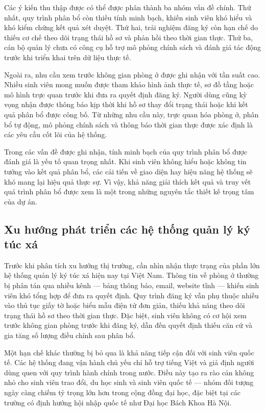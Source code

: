 \documentclass[../DoAn.tex]{subfiles}
\begin{document}
Các ý kiến thu thập được có thể được phân thành ba nhóm vấn đề chính. Thứ nhất,
quy trình phân bổ còn thiếu tính minh bạch, khiến sinh viên khó hiểu và khó
kiểm chứng kết quả xét duyệt. Thứ hai, trải nghiệm đăng ký còn hạn chế do thiếu
cơ chế theo dõi trạng thái hồ sơ và phản hồi theo thời gian thực. Thứ ba, cán
bộ quản lý chưa có công cụ hỗ trợ mô phỏng chính sách và đánh giá tác động trước
khi triển khai trên dữ liệu thực tế.

Ngoài ra, nhu cầu xem trước không gian phòng ở được ghi nhận với tần suất cao.
Nhiều sinh viên mong muốn được tham khảo hình ảnh thực tế, sơ đồ tầng hoặc mô
hình trực quan trước khi đưa ra quyết định đăng ký. Người dùng cũng kỳ vọng
nhận được thông báo kịp thời khi hồ sơ thay đổi trạng thái hoặc khi kết quả
phân bổ được công bố. Từ những nhu cầu này, trực quan hóa phòng ở, phân bổ tự
động, mô phỏng chính sách và thông báo thời gian thực được xác định là các yêu
cầu cốt lõi của hệ thống.

Trong các vấn đề được ghi nhận, tính minh bạch của quy trình phân bổ được đánh
giá là yếu tố quan trọng nhất. Khi sinh viên không hiểu hoặc không tin tưởng
vào kết quả phân bổ, các cải tiến về giao diện hay hiệu năng hệ thống sẽ khó
mang lại hiệu quả thực sự. Vì vậy, khả năng giải thích kết quả và truy vết quá
trình phân bổ được xem là một trong những nguyên tắc thiết kế trọng tâm của dự
án.


\subsection{Xu hướng phát triển các hệ thống quản lý ký túc xá}

Trước khi phân tích xu hướng thị trường, cần nhìn nhận thực trạng của phần lớn
hệ thống quản lý ký túc xá hiện nay tại Việt Nam. Thông tin về phòng ở thường
bị phân tán qua nhiều kênh --- bảng thông báo, email, website tĩnh --- khiến
sinh viên khó tổng hợp để đưa ra quyết định. Quy trình đăng ký vẫn phụ thuộc
nhiều vào thủ tục giấy tờ hoặc biểu mẫu điện tử đơn giản, thiếu khả năng theo
dõi trạng thái hồ sơ theo thời gian thực. Đặc biệt, sinh viên không có cơ hội
xem trước không gian phòng trước khi đăng ký, dẫn đến quyết định thiếu căn cứ
và gia tăng số lượng điều chỉnh sau phân bổ.

Một hạn chế khác thường bị bỏ qua là khả năng tiếp cận đối với sinh viên quốc
tế. Các hệ thống đang vận hành chủ yếu chỉ hỗ trợ tiếng Việt và giả định người
dùng quen với quy trình hành chính trong nước. Điều này tạo ra rào cản không
nhỏ cho sinh viên trao đổi, du học sinh và sinh viên quốc tế --- nhóm đối tượng
ngày càng chiếm tỷ trọng lớn hơn trong cộng đồng đại học, đặc biệt tại các
trường có định hướng hội nhập quốc tế như Đại học Bách Khoa Hà Nội.
\end{document}
